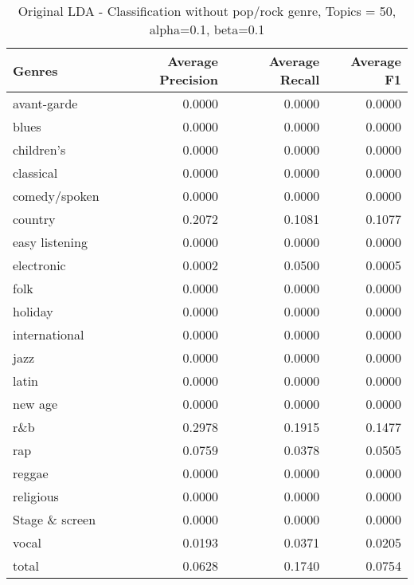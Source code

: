 \begin{table}[h]
\begin{tabular}{|l|r|r|r|}

\hline
\textbf{Genres} &  \textbf{Average Precision} & \textbf{Average Recall} & \textbf{Average F1} \\
\hline
avant-garde & 0.0000	& 0.0000& 	0.0000\\
blues& 0.0000& 	0.0000	& 0.0000\\
children's& 0.0000& 	0.0000	& 0.0000\\
classical& 0.0000& 	0.0000& 	0.0000\\
comedy/spoken& 0.0000& 	0.0000& 	0.0000\\
country& 0.2072& 	0.1081	& 0.1077\\
easy listening& 0.0000& 	0.0000	& 0.0000\\
electronic& 0.0002& 	0.0500& 	0.0005\\
folk& 0.0000& 	0.0000& 	0.0000\\
holiday& 0.0000& 	0.0000& 	0.0000\\
international& 0.0000& 	0.0000& 	0.0000\\
jazz& 0.0000& 	0.0000	& 0.0000\\
latin& 0.0000	& 0.0000& 	0.0000\\
new age& 0.0000& 	0.0000& 	0.0000\\
r\&b& 0.2978	& 0.1915& 	0.1477\\
rap& 0.0759& 	0.0378& 	0.0505\\
reggae& 0.0000& 	0.0000& 0.0000\\
religious& 0.0000	& 0.0000& 	0.0000\\
Stage \& screen& 0.0000	& 0.0000& 	0.0000\\
vocal& 0.0193& 	0.0371& 	0.0205\\
total& 0.0628& 	0.1740& 	0.0754\\
\hline
\end{tabular}
\caption{Original LDA - Classification without pop/rock genre, Topics = 50, alpha=0.1, beta=0.1}
\end{table}